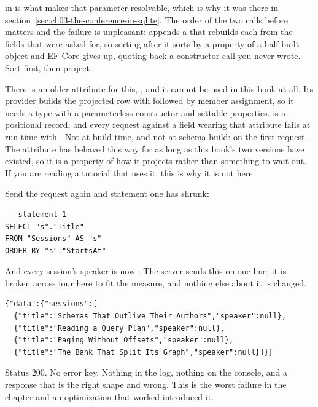  in  is what makes that parameter
resolvable, which is why it was there in
section~\ref{sec:ch03-the-conference-in-sqlite}. The order of the two calls
before  matters and the failure is unpleasant: 
appends a  that rebuilds each  from the fields that
were asked for, so sorting after it sorts by a property of a half-built object
and EF Core gives up, quoting back a constructor call you never wrote. Sort
first, then project.

%
There is an older attribute for this, \code{[UseProjection]}, and it cannot be
used in this book at all. Its provider builds the projected row with
 followed by member assignment, so it needs a type with a
parameterless constructor and settable properties.  is a
positional record, and every request against a field wearing that attribute
fails at run time with . Not at build time, and not at schema build: on the first request.
The attribute has behaved this way for as long as this book's two versions have
existed, so it is a property of how it projects rather than something to wait
out. If you are reading a tutorial that uses it, this is why it is not here.

Send the request again and statement one has shrunk:

\begin{verbatim}
-- statement 1
SELECT "s"."Title"
FROM "Sessions" AS "s"
ORDER BY "s"."StartsAt"
\end{verbatim}

%
And every session's speaker is now . The server sends this on one
line; it is broken across four here to fit the measure, and nothing else about
it is changed.

\begin{verbatim}
{"data":{"sessions":[
  {"title":"Schemas That Outlive Their Authors","speaker":null},
  {"title":"Reading a Query Plan","speaker":null},
  {"title":"Paging Without Offsets","speaker":null},
  {"title":"The Bank That Split Its Graph","speaker":null}]}}
\end{verbatim}

Status 200. No error key. Nothing in the log, nothing on the console, and a
response that is the right shape and wrong. This is the worst failure in the
chapter and an optimization that worked introduced it.


